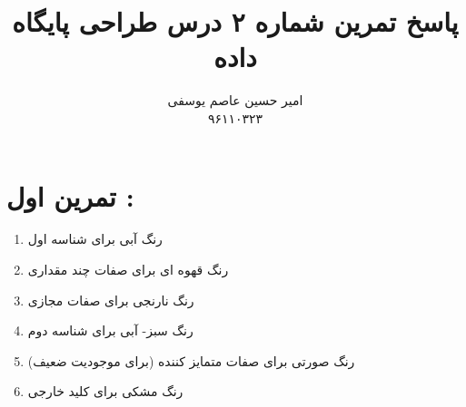 \documentclass{article}
\title{پاسخ تمرین شماره ۲ درس طراحی پایگاه داده }
\author{امیر حسین عاصم یوسفی \\ ۹۶۱۱۰۳۲۳}
\begin{document}
	\maketitle
	
	 \section*{تمرین اول  : }
	 \begin{center}
	 	\begin{enumerate}
	 		\item  	رنگ آبی
	 		برای شناسه اول 
	 		\item 	رنگ قهوه ای 
	 		برای صفات چند مقداری 
	 		\item 	رنگ نارنجی 
	 		برای صفات مجازی 
	 		\item 	رنگ سبز- آبی 
	 		برای شناسه دوم 
	 		\item 	رنگ صورتی 
	 		برای صفات متمایز کننده (برای موجودیت ضعیف)	
	 		\item رنگ مشکی 
	 		برای کلید خارجی 
	 	\end{enumerate}
	
	 \end{center}
\end{document}
